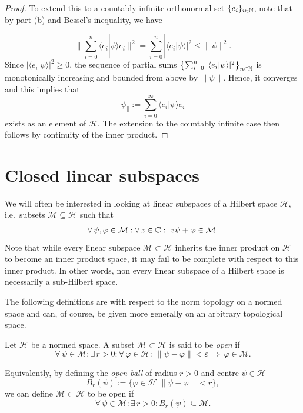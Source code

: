 \begin{proof}
To extend this to a countably infinite orthonormal set $\{e_i\}_{i\in \mathbb{N}}$, note that by part (b) and Bessel's inequality, we have

\begin{equation*}
\biggl\|\sum_{i=0}^n\langle e_i | \psi \rangle e_i\biggr\|^2 = \sum_{i=0}^n|\langle e_i | \psi \rangle|^2 \leq \|\psi\|^2.
\end{equation*}
Since $|\langle e_i | \psi \rangle|^2\geq 0$, the sequence of partial sums $\bigl\{\sum_{i=0}^n|\langle e_i | \psi \rangle|^2\bigr\}_{n\in \mathbb{N}}$ is monotonically increasing and bounded from above by $\|\psi\|$. Hence, it converges and this implies that 
\begin{equation*}
\psi_{\parallel}:=\sum_{i=0}^{\infty}\langle e_i | \psi \rangle e_i
\end{equation*}
exists as an element of $\mathcal{H}$. The extension to the countably infinite case then follows by continuity of the inner product.
\end{proof}

\section{Closed linear subspaces}

We will often be interested in looking at linear subspaces of a Hilbert space $\mathcal{H}$, i.e.\ subsets $\mathcal{M}\subseteq\mathcal{H}$ such that
\begin{equation*}
\forall \, \psi,\varphi\in\mathcal{M}:\forall \, z\in \mathbb{C} : \ z\psi+\varphi\in \mathcal{M}.
\end{equation*}
Note that while every linear subspace $\mathcal{M}\subset \mathcal{H}$ inherits the inner product on $\mathcal{H}$ to become an inner product space, it may fail to be complete with respect to this inner product. In other words, non every linear subspace of a Hilbert space is necessarily a sub-Hilbert space.

The following definitions are with respect to the norm topology on a normed space and can, of course, be given more generally on an arbitrary topological space.

\begin{definition}
Let $\mathcal{H}$ be a normed space. A subset $\mathcal{M}\subset \mathcal{H}$ is said to be \emph{open} if
\begin{equation*}
\forall \, \psi \in \mathcal{M} : \exists \, r>0 : \forall \, \varphi\in \mathcal{H} : \ \|\psi-\varphi\|<\varepsilon \, \Rightarrow\, \varphi\in\mathcal{M}.
\end{equation*}
\end{definition}
Equivalently, by defining the \emph{open ball} of radius $r>0$ and centre $\psi\in\mathcal{H}$
\begin{equation*}
B_r(\psi) := \{\varphi\in\mathcal{H}\mid\|\psi-\varphi\|<r\},
\end{equation*}
we can define $\mathcal{M}\subset \mathcal{H}$ to be open if
\begin{equation*}
\forall \, \psi \in \mathcal{M} : \exists \, r>0 :B_r(\psi)\subseteq\mathcal{M}.
\end{equation*}

